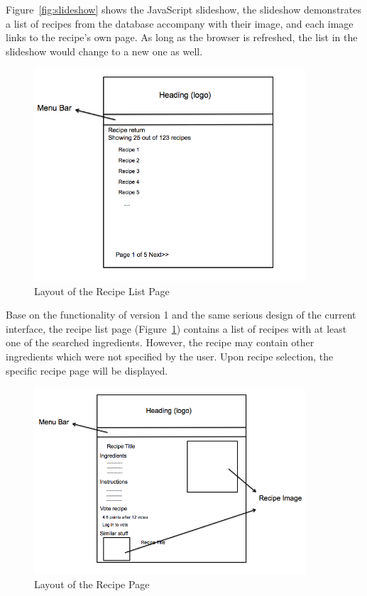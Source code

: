 Figure~\ref{fig:slideshow} shows the JavaScript slideshow, the slideshow demonstrates a list of recipes from the database accompany with their image, and each image links to the recipe's own page. As long as the browser is refreshed, the list in the slideshow would change to a new one as well. 

\begin{figure}[H]
\includegraphics[width=0.9\textwidth]{result_list_v2}
\caption{Layout of the Recipe List Page}
\label{fig:recipe_list_v2}
\end{figure}

Base on the functionality of version 1 and the same serious design of the current interface, the recipe list page (Figure~\ref{fig:recipe_list_v2}) contains a list of recipes with at least one of the searched ingredients. However, the recipe may contain other ingredients which were not specified by the user. Upon recipe selection, the specific recipe page will be displayed.

\begin{figure}[H]
\includegraphics[width=0.9\textwidth]{recipe_page_v2}
\caption{Layout of the Recipe Page}
\label{fig:recipe_page}
\end{figure}

